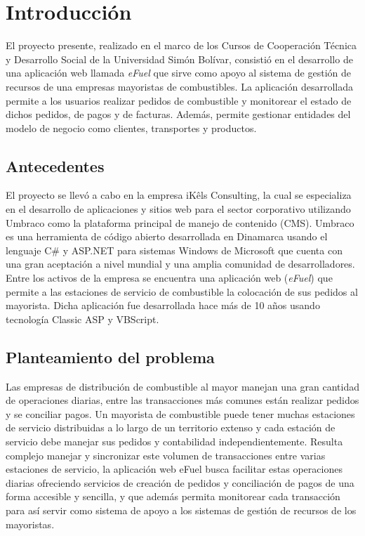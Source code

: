 \chapter*{Introducción}

El proyecto presente, realizado en el marco de los Cursos de Cooperación Técnica y Desarrollo Social de la Universidad Simón Bolívar, consistió en el desarrollo de una aplicación web llamada \emph{eFuel} que sirve como apoyo al sistema de gestión de recursos de una empresas mayoristas de combustibles. La aplicación desarrollada permite a los usuarios realizar pedidos de combustible y monitorear el estado de dichos pedidos, de pagos y de facturas. Además, permite gestionar entidades del modelo de negocio como clientes, transportes y productos.

\section*{Antecedentes}
El proyecto se llevó a cabo en la empresa iKêls Consulting, la cual se especializa en el desarrollo de aplicaciones y sitios web para el sector corporativo utilizando Umbraco como la plataforma principal de manejo de  contenido (CMS). Umbraco es una herramienta de código abierto desarrollada en Dinamarca usando el lenguaje C\# y ASP.NET para sistemas Windows de Microsoft que cuenta con una gran aceptación a nivel mundial y una amplia comunidad de desarrolladores. Entre los activos de la empresa se encuentra una aplicación web (\emph{eFuel}) que permite a las estaciones de servicio de combustible la colocación de sus pedidos al mayorista. Dicha aplicación fue desarrollada hace más de 10 años usando tecnología Classic ASP y VBScript.

\section*{Planteamiento del problema}
Las empresas de distribución de combustible al mayor manejan una gran cantidad de operaciones diarias, entre las transacciones más comunes están realizar pedidos y se conciliar pagos. Un mayorista de combustible puede tener muchas estaciones de servicio distribuidas a lo largo de un territorio extenso y cada estación de servicio debe manejar sus pedidos y contabilidad independientemente. Resulta complejo manejar y sincronizar este volumen de transacciones entre varias estaciones de servicio, la aplicación web eFuel busca facilitar estas operaciones diarias ofreciendo servicios de creación de pedidos y conciliación de pagos de una forma accesible y sencilla, y que además permita monitorear cada transacción para así servir como sistema de apoyo a los sistemas de gestión de recursos de los mayoristas.

